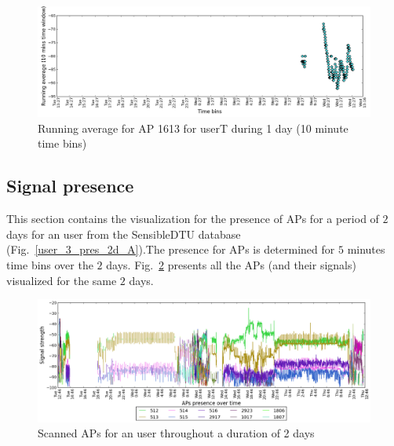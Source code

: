 \begin{figure}[!h]
\centering
\includegraphics[width
=\textwidth]{figures/rn_avg/user_1_sorted_1days_plot_1613_rn_avg_sig_10.png}
\caption{Running average for AP 1613 for userT during 1 day (10 minute time
bins)}
\label{user_1_AP1613_rn10avg_1d_A}
\end{figure}

\subsection{Signal presence}
\label{appendix_pres}
This section contains the visualization for the presence of APs for a period of
$2$ days for an user from the SensibleDTU database
(Fig.~\ref{user_3_pres_2d_A}).The presence for APs is determined for $5$ minutes
time bins over the $2$ days.
Fig.~\ref{user_3_APs_2d_A} presents all the APs (and their signals) visualized
for the same $2$ days.

\begin{figure}[!h]
\centering
\includegraphics[width
=\textwidth]{figures/presence/user_3_sorted_2days_plot.png}
\caption{Scanned APs for an user throughout a duration of 2 days}
\label{user_3_APs_2d_A}
\end{figure}

